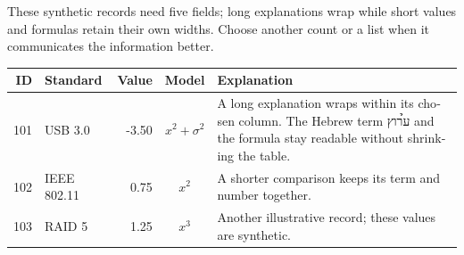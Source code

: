 \begin{englishprose}
\noindent These synthetic records need five fields; long explanations wrap
while short values and formulas retain their own widths. Choose another count
or a list when it communicates the information better.
\begin{center}
\begin{otherlanguage}{english}
\begin{tabular}{@{}rlrc>{\raggedright\arraybackslash}p{\dimexpr\linewidth-7.1cm\relax}@{}}
\toprule
\textbf{ID} & \textbf{Standard} & \textbf{Value} & \textbf{Model} & \textbf{Explanation}\\
\midrule
101 & USB 3.0 & -3.50 & $x^2+\sigma^2$ &
A long explanation wraps within its chosen column. The Hebrew term \h{ערוץ}
and the formula stay readable without shrinking the table.\\
102 & IEEE 802.11 & 0.75 & $x^2$ & A shorter comparison keeps its term and number together.\\
103 & RAID 5 & 1.25 & $x^3$ & Another illustrative record; these values are synthetic.\\
\bottomrule
\end{tabular}
\end{otherlanguage}
\end{center}
\end{englishprose}

